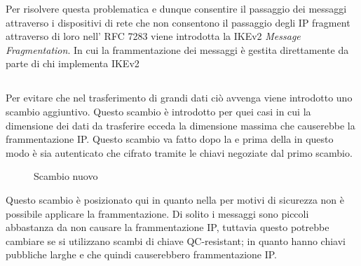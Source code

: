 Per risolvere questa problematica e dunque consentire il passaggio dei messaggi attraverso i dispositivi di rete che non consentono il passaggio degli IP fragment attraverso 
di loro nell' RFC 7283 viene introdotta la IKEv2 \textit{Message Fragmentation}. In cui la frammentazione dei messaggi è gestita direttamente da parte di chi implementa IKEv2

\subsection{}

Per evitare che nel trasferimento di grandi dati ciò avvenga viene introdotto uno scambio aggiuntivo. Questo scambio è introdotto per quei casi in cui la dimensione dei dati
da trasferire ecceda la dimensione massima che causerebbe la frammentazione IP. Questo scambio va fatto dopo la  e prima della  in questo
modo è sia autenticato che cifrato tramite le chiavi negoziate dal primo scambio.

\begin{figure}[htbp]
    \centering
    \caption{Scambio nuovo}
    \label{fig:ikeintermediate}
\end{figure}

Questo scambio è posizionato qui in quanto nella  per motivi di sicurezza non è possibile applicare la frammentazione.
Di solito i messaggi sono piccoli abbastanza da non causare la frammentazione IP, tuttavia questo potrebbe cambiare se si utilizzano scambi di chiave QC-resistant; in quanto
hanno chiavi pubbliche larghe e che quindi causerebbero frammentazione IP.

